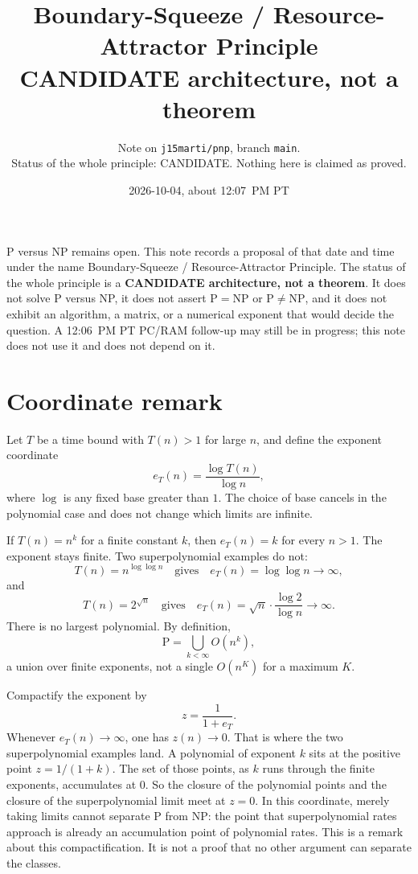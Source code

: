 \documentclass{article}
\title{Boundary-Squeeze / Resource-Attractor Principle\\
\large CANDIDATE architecture, not a theorem}
\author{Note on \texttt{j15marti/pnp}, branch \texttt{main}.\\
Status of the whole principle: CANDIDATE. Nothing here is claimed as proved.}
\date{2026-10-04, about 12:07~PM PT}
\begin{document}
\maketitle

\noindent
P versus NP remains open.
This note records a proposal of that date and time under the name
Boundary-Squeeze / Resource-Attractor Principle.
The status of the whole principle is a \textbf{CANDIDATE architecture, not a theorem}.
It does not solve P versus NP, it does not assert \(\mathrm{P}=\mathrm{NP}\) or \(\mathrm{P}\neq\mathrm{NP}\),
and it does not exhibit an algorithm, a matrix, or a numerical exponent that would decide the question.
A 12:06~PM PT PC/RAM follow-up may still be in progress; this note does not use it and does not depend on it.

\section{Coordinate remark}
Let \(T\) be a time bound with \(T(n)>1\) for large \(n\), and define the exponent coordinate
\[
e_T(n)=\frac{\log T(n)}{\log n},
\]
where \(\log\) is any fixed base greater than \(1\).
The choice of base cancels in the polynomial case and does not change which limits are infinite.

If \(T(n)=n^k\) for a finite constant \(k\), then \(e_T(n)=k\) for every \(n>1\).
The exponent stays finite.
Two superpolynomial examples do not:
\[
T(n)=n^{\log\log n}
\quad\text{gives}\quad
e_T(n)=\log\log n\to\infty,
\]
and
\[
T(n)=2^{\sqrt{n}}
\quad\text{gives}\quad
e_T(n)=\sqrt{n}\cdot\frac{\log 2}{\log n}\to\infty.
\]
There is no largest polynomial.
By definition,
\[
\mathrm{P}=\bigcup_{k<\infty} O(n^k),
\]
a union over finite exponents, not a single \(O(n^K)\) for a maximum \(K\).

Compactify the exponent by
\[
z=\frac{1}{1+e_T}.
\]
Whenever \(e_T(n)\to\infty\), one has \(z(n)\to 0\).
That is where the two superpolynomial examples land.
A polynomial of exponent \(k\) sits at the positive point \(z=1/(1+k)\).
The set of those points, as \(k\) runs through the finite exponents, accumulates at \(0\).
So the closure of the polynomial points and the closure of the superpolynomial limit meet at \(z=0\).
In this coordinate, merely taking limits cannot separate \(\mathrm{P}\) from \(\mathrm{NP}\):
the point that superpolynomial rates approach is already an accumulation point of polynomial rates.
This is a remark about this compactification.
It is not a proof that no other argument can separate the classes.
\end{document}
